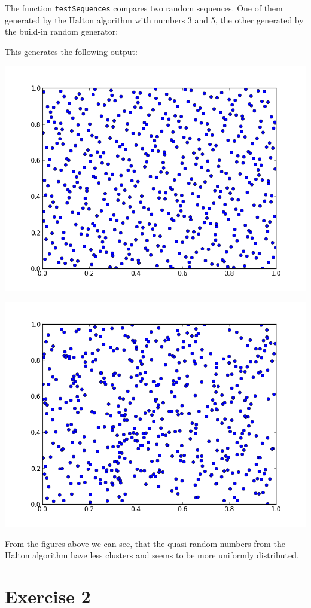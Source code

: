 \documentclass[%
]
{scrartcl}
\theoremstyle{plain}
\begin{document}
The function \texttt{testSequences} compares two random sequences. One of them generated by the Halton algorithm with numbers 3 and 5, the other generated by the build-in random generator:



This generates the following output:

\begin{center}
\centering
\includegraphics[width=0.6\linewidth]{../QuasiRandom1.png}
\end{center}

\begin{center}
\centering
\includegraphics[width=0.6\linewidth]{../QuasiRandom2.png}
\end{center}

From the figures above we can see, that the quasi random numbers from the Halton algorithm have less clusters and seems to be more uniformly distributed.

\section*{Exercise 2}
\end{document}
